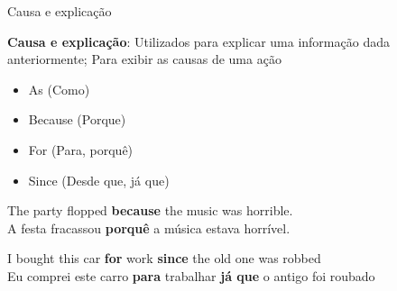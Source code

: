 \documentclass[compress,mathserif,xcolor=table]{beamer}
\begin{document}
\begin{frame}{Causa e explicação}

\textbf{Causa e explicação}: Utilizados para explicar uma informação dada anteriormente; Para exibir as causas de uma ação

\vspace{0.25cm}

\begin{minipage}{.49\textwidth}
\begin{itemize}
    \item As (Como)
    \item Because (Porque)
\end{itemize}
\end{minipage}
\begin{minipage}{.49\textwidth}
\begin{itemize}
    \item For (Para, porquê)
    \item Since (Desde que, já que)
\end{itemize}
\end{minipage}

\vspace{0.5cm}

The party flopped \textbf{because} the music was horrible. \\
\vspace{0.15cm}
A festa fracassou \textbf{porquê} a música estava horrível.

\vspace{0.25cm}

I bought this car \textbf{for} work \textbf{since} the old one was robbed \\
\vspace{0.15cm}
Eu comprei este carro \textbf{para} trabalhar \textbf{já que} o antigo foi roubado

\end{frame}



\end{document}
